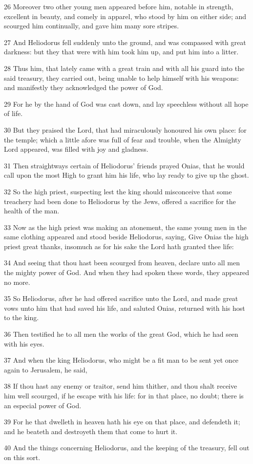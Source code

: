 \par 26 Moreover two other young men appeared before him, notable in strength, excellent in beauty, and comely in apparel, who stood by him on either side; and scourged him continually, and gave him many sore stripes.
\par 27 And Heliodorus fell suddenly unto the ground, and was compassed with great darkness: but they that were with him took him up, and put him into a litter.
\par 28 Thus him, that lately came with a great train and with all his guard into the said treasury, they carried out, being unable to help himself with his weapons: and manifestly they acknowledged the power of God.
\par 29 For he by the hand of God was cast down, and lay speechless without all hope of life.
\par 30 But they praised the Lord, that had miraculously honoured his own place: for the temple; which a little afore was full of fear and trouble, when the Almighty Lord appeared, was filled with joy and gladness.
\par 31 Then straightways certain of Heliodorus' friends prayed Onias, that he would call upon the most High to grant him his life, who lay ready to give up the ghost.
\par 32 So the high priest, suspecting lest the king should misconceive that some treachery had been done to Heliodorus by the Jews, offered a sacrifice for the health of the man.
\par 33 Now as the high priest was making an atonement, the same young men in the same clothing appeared and stood beside Heliodorus, saying, Give Onias the high priest great thanks, insomuch as for his sake the Lord hath granted thee life:
\par 34 And seeing that thou hast been scourged from heaven, declare unto all men the mighty power of God. And when they had spoken these words, they appeared no more.
\par 35 So Heliodorus, after he had offered sacrifice unto the Lord, and made great vows unto him that had saved his life, and saluted Onias, returned with his host to the king.
\par 36 Then testified he to all men the works of the great God, which he had seen with his eyes.
\par 37 And when the king Heliodorus, who might be a fit man to be sent yet once again to Jerusalem, he said,
\par 38 If thou hast any enemy or traitor, send him thither, and thou shalt receive him well scourged, if he escape with his life: for in that place, no doubt; there is an especial power of God.
\par 39 For he that dwelleth in heaven hath his eye on that place, and defendeth it; and he beateth and destroyeth them that come to hurt it.
\par 40 And the things concerning Heliodorus, and the keeping of the treasury, fell out on this sort.

